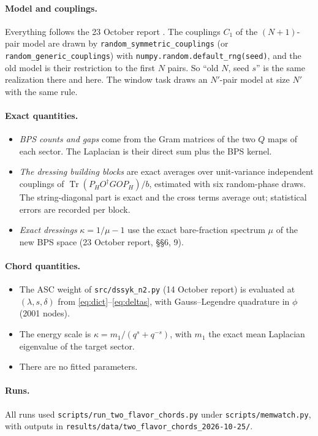 \documentclass[11pt]{article}
\newcommand{\Tr}{\operatorname{Tr}}
\newcommand{\Np}{N'}
\theoremstyle{plain}
\theoremstyle{remark}
\numberwithin{equation}{section}
\begin{document}
\paragraph{Model and couplings.} Everything follows the 23 October report \cite{prog1023}. The couplings $C_1$ of the
$(N+1)$-pair model are drawn by \texttt{random\_symmetric\_couplings} (or \texttt{random\_generic\_couplings}) with
\texttt{numpy.random.default\_rng(seed)}, and the old model is their restriction to the first $N$ pairs. So ``old $N$, seed $s$'' is the same realization there and
here. The window task draws an $\Np$-pair model at size $\Np$ with the same rule.

\paragraph{Exact quantities.}
\begin{itemize}\itemsep1pt
\item \emph{BPS counts and gaps} come from the Gram matrices of the two $Q$ maps of each sector. The Laplacian is their
  direct sum plus the BPS kernel.
\item \emph{The dressing building blocks} are exact averages over unit-variance independent couplings of
  $\Tr(P_H O^\dagger G O P_H)/b$, estimated with six random-phase draws. The string-diagonal part is exact and the cross
  terms average out; statistical errors are recorded per block.
\item \emph{Exact dressings} $\kappa=1/\mu-1$ use the exact bare-fraction spectrum $\mu$ of the new BPS space (23 October
  report, \S\S6, 9).
\end{itemize}

\paragraph{Chord quantities.}
\begin{itemize}\itemsep1pt
\item The ASC weight of \texttt{src/dssyk\_n2.py} (14 October report) is evaluated at $(\lambda,s,\delta)$ from
  \eqref{eq:dict}--\eqref{eq:deltas}, with Gauss--Legendre quadrature in $\phi$ (2001 nodes).
\item The energy scale is $\kappa=m_1/(q^s+q^{-s})$, with $m_1$ the exact mean Laplacian eigenvalue of the target
  sector.
\item There are no fitted parameters.
\end{itemize}

\paragraph{Runs.} All runs used \texttt{scripts/run\_two\_flavor\_chords.py} under \texttt{scripts/memwatch.py}, with
outputs in \texttt{results/data/two\_flavor\_chords\_2026-10-25/}.
\end{document}
